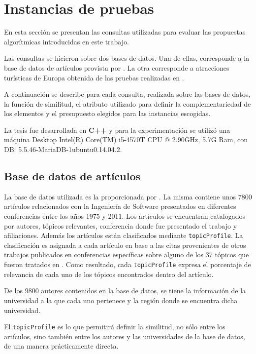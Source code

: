 \section{Instancias de pruebas}\label{sect:busquedas}
En esta sección se presentan las consultas utilizadas para evaluar las propuestas algorítmicas introducidas en este trabajo. 

Las consultas se hicieron sobre dos bases de datos. Una de ellas, corresponde a la base de datos de artículos provista por \cite{dataDrive}. La otra corresponde a atracciones turísticas de Europa obtenida de las pruebas realizadas en \cite{journals/tkde/Amer-YahiaBCFMZ14}.

A continuación se describe para cada consulta, realizada sobre las bases de datos, la función de similitud, el atributo utilizado para definir la complementariedad de los elementos y el presupuesto elegidos para las instancias escogidas. 

La tesis fue desarrollada en \textbf{C++} y para la experimentación se utilizó una máquina Desktop Intel(R) Core(TM) i5-4570T CPU @ 2.90GHz, 5.7G Ram, con DB: 5.5.46-MariaDB-1ubuntu0.14.04.2.

\subsection{Base de datos de artículos}
La base de datos utilizada es la proporcionada por \cite{dataDrive}. La misma contiene unos $7800$ artículos relacionados con la Ingeniería de Software presentados en diferentes conferencias entre los años 1975 y 2011. Los artículos se encuentran catalogados por autores, tópicos relevantes, conferencia donde fue presentado el trabajo y afiliaciones. Además los artículos están clasificados mediante \texttt{topicProfile}. La clasificación es asignada a cada artículo en base a las citas provenientes de otros trabajos publicados en conferencias específicas sobre alguno de los 37 tópicos que fueron tratados en \cite{dataDrive}. Como resultado, cada \texttt{topicProfile} expresa el porcentaje de relevancia de cada uno de los tópicos encontrados dentro del artículo. 

De los $9800$ autores contenidos en la base de datos, se tiene la información de la universidad a la que cada uno pertenece y la región donde se encuentra dicha universidad.

El \texttt{topicProfile} es lo que permitirá definir la similitud, no sólo entre los artículos, sino también entre los autores y las universidades de la base de datos, de una manera prácticamente directa.

